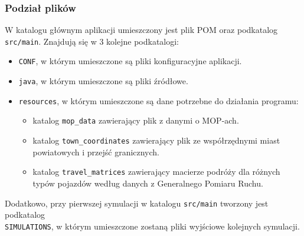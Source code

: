 \subsubsection{Podział plików}
W katalogu głównym aplikacji umieszczony jest plik POM oraz podkatalog \texttt{src/main}. Znajdują się w 3 kolejne podkatalogi:
\begin{itemize}
\item \texttt{CONF}, w którym umieszczone są pliki konfiguracyjne aplikacji.
\item \texttt{java}, w którym umieszczone są pliki źródłowe.
\item \texttt{resources}, w którym umieszczone są dane potrzebne do działania programu:
    \begin{itemize}
        \item katalog \texttt{mop\_data} zawierający plik z danymi o MOP-ach.
        \item katalog \texttt{town\_coordinates} zawierający plik ze współrzędnymi miast powiatowych i przejść granicznych.
        \item katalog \texttt{travel\_matrices} zawierający macierze podróży dla różnych typów pojazdów według danych z Generalnego Pomiaru Ruchu.
    \end{itemize}
\end{itemize}
Dodatkowo, przy pierwszej symulacji w katalogu \texttt{src/main} tworzony jest podkatalog \\\texttt{SIMULATIONS}, w którym umieszczone zostaną pliki wyjściowe kolejnych symulacji.
